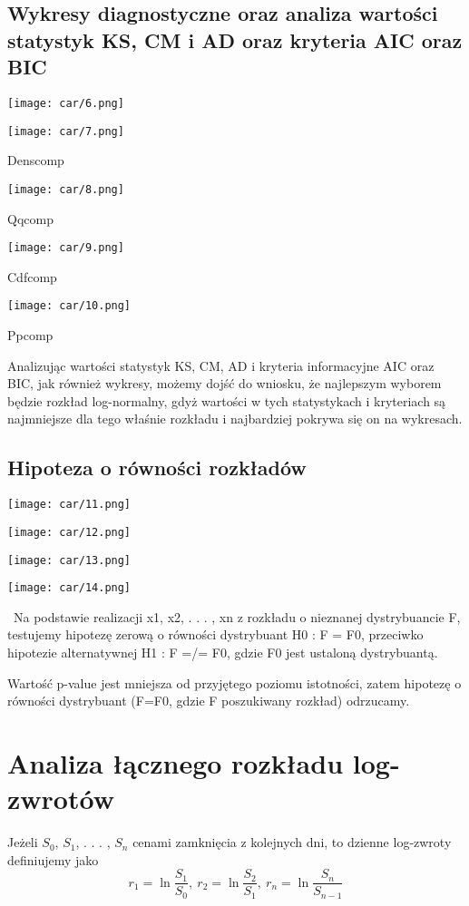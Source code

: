 \documentclass[a4paper,11pt]{article}
\def\\{\hfill\break}
\begin{document}
\subsection{Wykresy diagnostyczne oraz analiza wartości statystyk KS, CM i AD oraz kryteria AIC oraz BIC}
\centerline{\texttt{[image: car/6.png]}}
\\
\centerline{\texttt{[image: car/7.png]}}
\centerline{Denscomp}

\centerline{\texttt{[image: car/8.png]}}
\centerline{Qqcomp}

\centerline{\texttt{[image: car/9.png]}}
\centerline{Cdfcomp}

\centerline{\texttt{[image: car/10.png]}}
\centerline{Ppcomp}

Analizując wartości statystyk KS, CM, AD i kryteria informacyjne AIC oraz  BIC, jak również wykresy, możemy dojść do wniosku, że najlepszym wyborem będzie rozkład log-normalny, gdyż wartości w tych statystykach i kryteriach są najmniejsze dla tego właśnie rozkładu i najbardziej pokrywa się on na wykresach. 

\subsection{Hipoteza o równości rozkładów}
\centerline{\texttt{[image: car/11.png]}}\\
\centerline{\texttt{[image: car/12.png]}}\\
\centerline{\texttt{[image: car/13.png]}}\\
\centerline{\texttt{[image: car/14.png]}}\\\
Na podstawie realizacji x1, x2, . . . , xn z rozkładu o nieznanej dystrybuancie F, testujemy hipotezę zerową o równości dystrybuant H0 : F = F0, przeciwko hipotezie alternatywnej  H1 : F =/= F0, gdzie F0 jest ustaloną dystrybuantą. 

Wartość p-value jest mniejsza od przyjętego poziomu istotności, zatem hipotezę o równości dystrybuant (F=F0, gdzie F poszukiwany rozkład) odrzucamy. 
\newpage
\section{Analiza łącznego rozkładu log-zwrotów}
Jeżeli $S_{0}$, $S_{1}$, . . . , $S_{n}$ cenami zamknięcia z kolejnych dni, to dzienne log-zwroty definiujemy jako
$$r_{1} =\ln\frac{S_{1}}{S_{0}},\:r_{2} =\ln\frac{S_{2}}{S_{1}},\:r_{n} =\ln\frac{S_{n}}{S_{n-1}}$$
\end{document}
